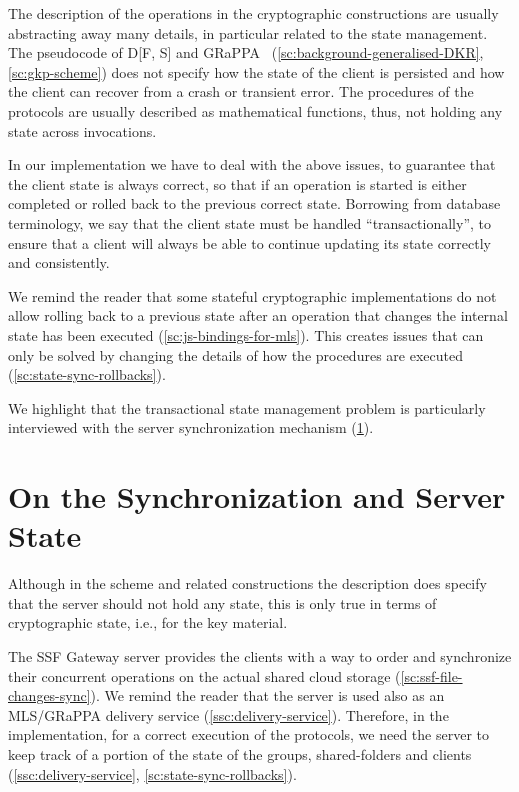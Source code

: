 The description of the operations in the cryptographic
constructions are usually abstracting away many details,
in particular related to the state management.
The pseudocode of D[F, S] and GRaPPA~\cite{GKP} (\cref{sc:background-generalised-DKR}, \cref{sc:gkp-scheme}) 
does not specify how the state of the client is persisted 
and how the client can recover from a crash or transient error.
The procedures of the protocols are usually described as
mathematical functions, thus, not holding any state across
invocations.

In our implementation we have to deal with the above issues,
to guarantee that the client state is always correct,
so that if an operation is started is either completed
or rolled back to the previous correct state.
Borrowing from database terminology, we say that the client
state must be handled ``transactionally'', to ensure that
a client will always be able to continue updating its state
correctly and consistently.

We remind the reader that some stateful cryptographic implementations do not
allow rolling back to a previous state after an operation
that changes the internal state has been executed (\cref{sc:js-bindings-for-mls}).
This creates issues that can only be solved by changing
the details of how the procedures are executed (\cref{sc:state-sync-rollbacks}).

We highlight that the transactional state management problem
is particularly interviewed with the server synchronization
mechanism (\cref{sc:gap-synchronization-server-state}).


\section{On the Synchronization and Server State}\label{sc:gap-synchronization-server-state}

Although in the scheme and related constructions the description
does specify that the server should not hold any state,
this is only true in terms of cryptographic state, i.e., for
the key material.

The SSF Gateway server provides the clients with a way to order and synchronize
their concurrent operations on the actual shared cloud storage (\cref{sc:ssf-file-changes-sync}).
We remind the reader that 
the server is used also as an MLS/GRaPPA delivery service (\cref{ssc:delivery-service}).
Therefore, in the implementation, for a correct execution of the protocols, 
we need the server
to keep track of a portion of the state of the groups, 
shared-folders and clients (\cref{ssc:delivery-service}, \cref{sc:state-sync-rollbacks}).


